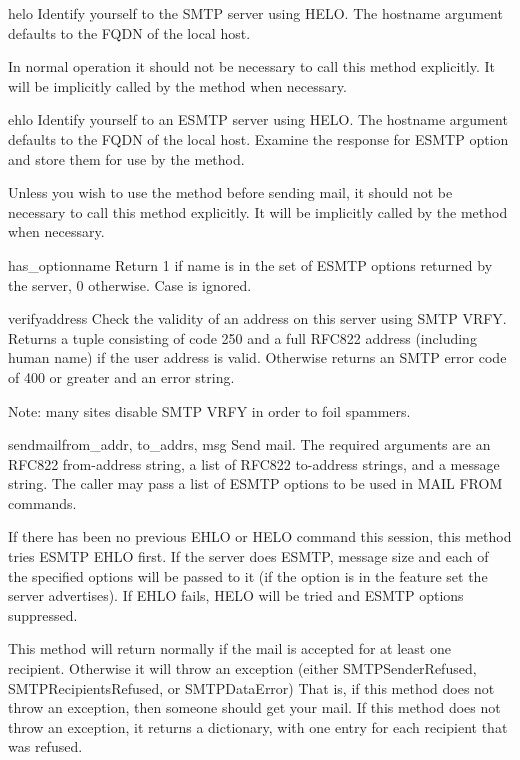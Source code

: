\begin{methoddesc}{helo}{}
Identify yourself to the SMTP server using HELO.  The hostname
argument defaults to the FQDN of the local host.

In normal operation it should not be necessary to call this method
explicitly.  It will be implicitly called by the  method
when necessary.
\end{methoddesc}

\begin{methoddesc}{ehlo}{}
Identify yourself to an ESMTP server using HELO.  The hostname
argument defaults to the FQDN of the local host.  Examine the 
response for ESMTP option and store them for use by the
 method.

Unless you wish to use the  method before sending
mail, it should not be necessary to call this method explicitly.  It
will be implicitly called by the  method when necessary.
\end{methoddesc}

\begin{methoddesc}{has_option}{name}
Return 1 if name is in the set of ESMTP options returned by the
server, 0 otherwise.  Case is ignored.
\end{methoddesc}

\begin{methoddesc}{verify}{address}
Check the validity of an address on this server using SMTP VRFY.
Returns a tuple consisting of code 250 and a full RFC822 address
(including human name) if the user address is valid. Otherwise returns
an SMTP error code of 400 or greater and an error string.

Note: many sites disable SMTP VRFY in order to foil spammers.
\end{methoddesc}

\begin{methoddesc}{sendmail}{from_addr, to_addrs, msg}
Send mail.  The required arguments are an RFC822 from-address string,
a list of RFC822 to-address strings, and a message string.  The caller
may pass a list of ESMTP options to be used in MAIL FROM commands.

If there has been no previous EHLO or HELO command this session, this
method tries ESMTP EHLO first. If the server does ESMTP, message size
and each of the specified options will be passed to it (if the option
is in the feature set the server advertises).  If EHLO fails, HELO
will be tried and ESMTP options suppressed.

This method will return normally if the mail is accepted for at least 
one recipient. Otherwise it will throw an exception (either
SMTPSenderRefused, SMTPRecipientsRefused, or SMTPDataError)
That is, if this method does not throw an exception, then someone 
should get your mail.  If this method does not throw an exception,
it returns a dictionary, with one entry for each recipient that was 
refused. 
\end{methoddesc}

